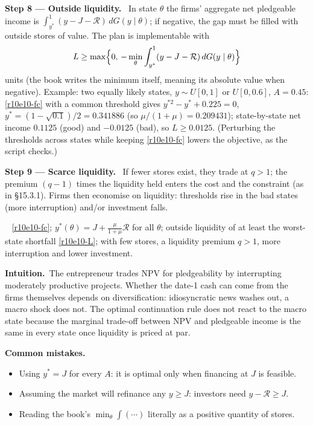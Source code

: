 \documentclass[11pt,a4paper]{article}
\newcommand{\step}[2]{\par\medskip\noindent\textbf{Step #1 --- #2.}~}
\newcommand{\intuition}{\par\medskip\noindent\textbf{Intuition.}~}
\newcommand{\answer}[1]{\par\smallskip\noindent\fbox{\textbf{Answer\if\relax\detokenize{#1}\relax\else\ #1\fi.}}~}
\newcommand{\pitfalls}{\par\medskip\noindent\textbf{Common mistakes.}}
\newcommand{\Rc}{\mathcal{R}}
\begin{document}
\step{8}{Outside liquidity} In state $\theta$ the firms' aggregate net pledgeable income is $\int_{y^*}^1(y-J-\Rc)\,dG(y\mid\theta)$; if negative, the gap must be filled with outside stores of value. The plan is implementable with
\begin{align}
  L\geq\max\Bigl\{0,\,-\min_\theta\int_{y^*}^1(y-J-\Rc)\,dG(y\mid\theta)\Bigr\} \label{r10e10-L}
\end{align}
units (the book writes the minimum itself, meaning its absolute value when negative). Example: two equally likely states, $y\sim U[0,1]$ or $U[0,0.6]$, $A=0.45$: \eqref{r10e10-fc} with a common threshold gives $y^{*2}-y^*+0.225=0$, $y^*=(1-\sqrt{0.1})/2=0.341886$ (so $\mu/(1+\mu)=0.209431$); state-by-state net income $0.1125$ (good) and $-0.0125$ (bad), so $L\geq0.0125$. (Perturbing the thresholds across states while keeping \eqref{r10e10-fc} lowers the objective, as the script checks.)

\step{9}{Scarce liquidity} If fewer stores exist, they trade at $q>1$; the premium $(q-1)$ times the liquidity held enters the cost and the constraint (as in \S15.3.1). Firms then economise on liquidity: thresholds rise in the bad states (more interruption) and/or investment falls.

\answer{(iv)} \eqref{r10e10-fc}; $y^*(\theta)=J+\frac{\mu}{1+\mu}\Rc$ for all $\theta$; outside liquidity of at least the worst-state shortfall \eqref{r10e10-L}; with few stores, a liquidity premium $q>1$, more interruption and lower investment.

\intuition The entrepreneur trades NPV for pledgeability by interrupting moderately productive projects. Whether the date-1 cash can come from the firms themselves depends on diversification: idiosyncratic news washes out, a macro shock does not. The optimal continuation rule does not react to the macro state because the marginal trade-off between NPV and pledgeable income is the same in every state once liquidity is priced at par.

\pitfalls
\begin{itemize}
  \item Using $y^*=J$ for every $A$: it is optimal only when financing at $J$ is feasible.
  \item Assuming the market will refinance any $y\geq J$: investors need $y-\Rc\geq J$.
  \item Reading the book's $\min_\theta\int(\cdots)$ literally as a positive quantity of stores.
\end{itemize}
\end{document}
